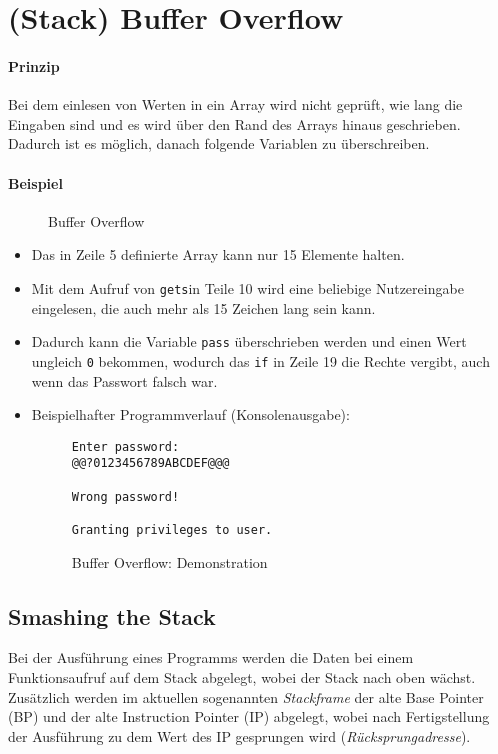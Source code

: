 \section{(Stack) Buffer Overflow}
	\paragraph{Prinzip}
		Bei dem einlesen von Werten in ein Array wird nicht geprüft, wie lang die Eingaben sind und es wird über den Rand des Arrays hinaus geschrieben. Dadurch ist es möglich, danach folgende Variablen zu überschreiben.

	\paragraph{Beispiel}
		\begin{figure}[H]
			\centering
			
			\caption{Buffer Overflow}
		\end{figure}
		\begin{itemize}
			\item Das in Zeile 5 definierte Array kann nur 15 Elemente halten.
			\item Mit dem Aufruf von \texttt{gets}in Teile 10 wird eine beliebige Nutzereingabe eingelesen, die auch mehr als 15 Zeichen lang sein kann.
			\item Dadurch kann die Variable \texttt{pass} überschrieben werden und einen Wert ungleich \texttt{0} bekommen, wodurch das \texttt{if} in Zeile 19 die Rechte vergibt, auch wenn das Passwort falsch war.
			\item Beispielhafter Programmverlauf (Konsolenausgabe):
				\begin{figure}[H]
					\centering
					\begin{lstlisting}[numbers = none]
Enter password:
@@?0123456789ABCDEF@@@

Wrong password!

Granting privileges to user.
\end{lstlisting}
					\caption{Buffer Overflow: Demonstration}
				\end{figure}
		\end{itemize}

	\subsection{Smashing the Stack}
		Bei der Ausführung eines Programms werden die Daten bei einem Funktionsaufruf auf dem Stack abgelegt, wobei der Stack nach oben wächst. Zusätzlich werden im aktuellen sogenannten \textit{Stackframe} der alte Base Pointer (BP) und der alte Instruction Pointer (IP) abgelegt, wobei nach Fertigstellung der Ausführung zu dem Wert des IP gesprungen wird (\textit{Rücksprungadresse}).

